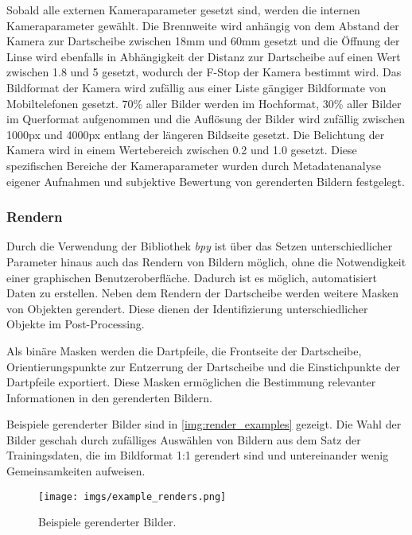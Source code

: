 Sobald alle externen Kameraparameter gesetzt sind, werden die internen Kameraparameter gewählt. Die Brennweite wird anhängig von dem Abstand der Kamera zur Dartscheibe zwischen 18mm und 60mm gesetzt und die Öffnung der Linse wird ebenfalls in Abhängigkeit der Distanz zur Dartscheibe auf einen Wert zwischen 1.8 und 5 gesetzt, wodurch der F-Stop der Kamera bestimmt wird. Das Bildformat der Kamera wird zufällig aus einer Liste gängiger Bildformate von Mobiltelefonen gesetzt. 70\% aller Bilder werden im Hochformat, 30\% aller Bilder im Querformat aufgenommen und die Auflösung der Bilder wird zufällig zwischen 1000px und 4000px entlang der längeren Bildseite gesetzt. Die Belichtung der Kamera wird in einem Wertebereich zwischen 0.2 und 1.0 gesetzt. Diese spezifischen Bereiche der Kameraparameter wurden durch Metadatenanalyse eigener Aufnahmen und subjektive Bewertung von gerenderten Bildern festgelegt.


\subsubsection{Rendern}
\label{sec:impl:daten:python:render}

Durch die Verwendung der Bibliothek \textit{bpy} ist über das Setzen unterschiedlicher Parameter hinaus auch das Rendern von Bildern möglich, ohne die Notwendigkeit einer graphischen Benutzeroberfläche. Dadurch ist es möglich, automatisiert Daten zu erstellen. Neben dem Rendern der Dartscheibe werden weitere Masken von Objekten gerendert. Diese dienen der Identifizierung unterschiedlicher Objekte im Post-Processing.

Als binäre Masken werden die Dartpfeile, die Frontseite der Dartscheibe, Orientierungspunkte zur Entzerrung der Dartscheibe und die Einstichpunkte der Dartpfeile exportiert. Diese Masken ermöglichen die Bestimmung relevanter Informationen in den gerenderten Bildern.

Beispiele gerenderter Bilder sind in \autoref{img:render_examples} gezeigt. Die Wahl der Bilder geschah durch zufälliges Auswählen von Bildern aus dem Satz der Trainingsdaten, die im Bildformat 1:1 gerendert sind und untereinander wenig Gemeinsamkeiten aufweisen.

\begin{figure}
    \centering
    \texttt{[image: imgs/example\_renders.png]}
    \caption{Beispiele gerenderter Bilder.}
    \label{img:render_examples}
\end{figure}



